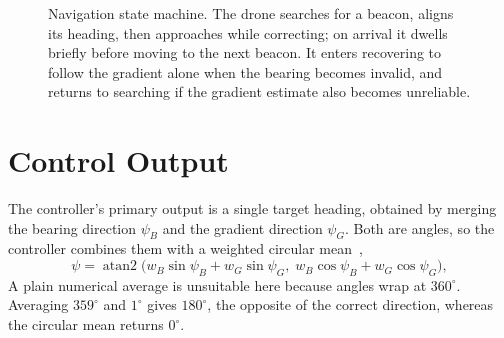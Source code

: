 \begin{figure}[h]
    \centering
    \caption{Navigation state machine. The drone searches for a beacon, aligns its heading, then approaches while correcting; on arrival it dwells briefly before moving to the next beacon. It enters recovering to follow the gradient alone when the bearing becomes invalid, and returns to searching if the gradient estimate also becomes unreliable.}
    \label{fig:state-machine}
\end{figure}

\section{Control Output}

The controller's primary output is a single target heading, obtained by merging the bearing direction $\psi_B$ and the gradient direction $\psi_G$. Both are angles, so the controller combines them with a weighted circular mean~\cite{mardia2000directional},
\begin{equation}
\psi = \operatorname{atan2}\!\big(w_B \sin\psi_B + w_G \sin\psi_G,\; w_B \cos\psi_B + w_G \cos\psi_G\big),
\label{eq:fusion}
\end{equation}
A plain numerical average is unsuitable here because angles wrap at $360^\circ$. Averaging $359^\circ$ and $1^\circ$ gives $180^\circ$, the opposite of the correct direction, whereas the circular mean returns $0^\circ$.

